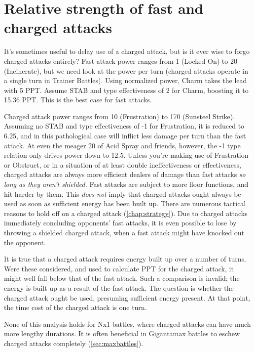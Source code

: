 \section{Relative strength of fast and charged attacks\label{sec:fastvchaged}}
It's sometimes useful to delay use of a charged attack, but is it ever wise to forgo
  charged attacks entirely?
Fast attack power ranges from 1 (Locked On) to 20 (Incinerate), but we need look at
  the power per turn (charged attacks operate in a single turn in Trainer Battles).
Using normalized power, Charm takes the lead with 5 PPT\@.
Assume STAB and type effectiveness of 2 for Charm, boosting it to 15.36 PPT\@.
This is the best case for fast attacks.

Charged attack power ranges from 10 (Frustration) to 170 (Sunsteel Strike).
Assuming no STAB and type effectiveness of -1 for Frustration, it is reduced to 6.25,
  and in this pathological case will inflict less damage per turn than the fast attack.
At even the meager 20 of Acid Spray and friends, however, the -1 type relation only
  drives power down to 12.5.
Unless you're making use of Frustration or Obstruct,
  or in a situation of at least double ineffectiveness or effectiveness,
  charged attacks are always more efficient dealers of damage than fast attacks \textit{so long
  as they aren't shielded.}
Fast attacks are subject to more floor functions, and hit harder by them.
This \textit{does not} imply that charged attacks ought always be used as soon as
  sufficient energy has been built up.
There are numerous tactical reasons to hold off on a charged attack (\autoref{chap:strategy}).
Due to charged attacks immediately concluding opponents' fast attacks,
 it is even possible to lose by throwing a shielded charged attack, when
 a fast attack might have knocked out the opponent.

It is true that a charged attack requires energy built up over a number of turns.
Were these considered, and used to calculate PPT for the charged attack,
  it might well fall below that of the fast attack.
Such a comparison is invalid; the energy is built up as a result of the fast attack.
The question is whether the charged attack ought be used, presuming sufficient energy present.
At that point, the time cost of the charged attack is one turn.

None of this analysis holds for Nx1 battles, where charged attacks can have much more lengthy durations.
It is often beneficial in Gigantamax battles to eschew charged attacks completely (\autoref{sec:maxbattles}).


